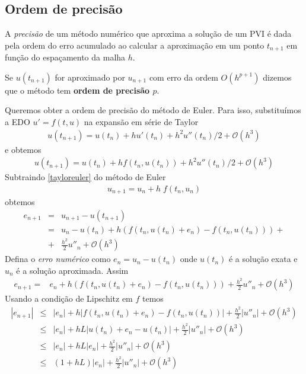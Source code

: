 \subsection{Ordem de precisão}

A \emph{precisão} de um método numérico que aproxima a solução de um PVI é dada pela ordem do erro acumulado ao calcular a aproximação em um ponto $t_{n+1}$ em função do espaçamento da malha $h$.

Se $u(t_{n+1})$ for aproximado por $u_{n+1}$ com erro da ordem $O(h^{p+1})$ dizemos que o método tem \textbf{ordem de precisão $p$}.


Queremos obter a ordem de precisão do método de Euler. Para isso, substituímos a EDO $u'=f(t,u)$ na expansão em série de Taylor
\begin{eqnarray}\label{taylor}
   u(t_{n+1})=u(t_n)+hu'(t_n)+h^2u''(t_n)/2+ \mathcal O(h^3)
\end{eqnarray}
e obtemos
\begin{eqnarray}\label{tayloreuler}
 u(t_{n+1})=u(t_n)+hf(t_n,u(t_n))+h^2u''(t_n)/2+ \mathcal O(h^3)
\end{eqnarray}
Subtraindo \eqref{tayloreuler} do método de Euler
\begin{eqnarray}
    u_{n+1}=u_n + h\;f(t_n,u_n)
\end{eqnarray}
obtemos
\begin{eqnarray}
   e_{n+1}   &=& u_{n+1}-u(t_{n+1}) \\
             &=&u_n - u(t_n)  +h(f(t_n,u(t_n)+e_n)- f(t_n,u(t_n))) +\\
             &+&\frac{h^2}{2}u''_n+\mathcal O(h^3)
\end{eqnarray}
Defina o \emph{erro numérico} como $e_n=u_n-u(t_n)$ onde $u(t_n)$ é a solução exata e $u_n$ é a solução aproximada. Assim
\begin{eqnarray}
   e_{n+1}    =&e_n + h(f(t_n,u(t_n)+e_n)- f(t_n,u(t_n))) +\frac{h^2}{2}u''_n+\mathcal O(h^3)
\end{eqnarray}
Usando a condição de Lipschitz em $f$  temos
\begin{eqnarray}
   |e_{n+1}|      &\le &  |e_n| + h|f(t_n,u(t_n)+e_n)- f(t_n,u(t_n))|+\frac{h^2}{2}|u''_n|+\mathcal O(h^3)\\
                  &\le &  |e_n| + hL |u(t_n)+e_n- u(t_n)|+\frac{h^2}{2}|u''_n|+\mathcal O(h^3)\\
                  &\le &  |e_n| + hL |e_n|+\frac{h^2}{2}|u''_n|+\mathcal O(h^3)\\
                  &\le &  (1+ hL) |e_n|+\frac{h^2}{2}|u''_n|+\mathcal O(h^3)
\end{eqnarray}


